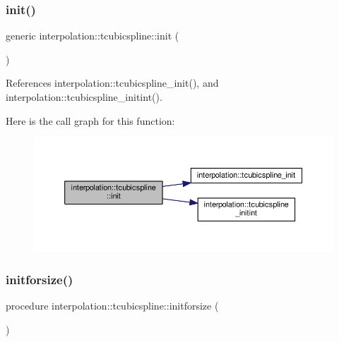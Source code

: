 \mbox{\label{structinterpolation_1_1tcubicspline_a9634c89ee18748f7ec14a6c60434a643}} 
\subsubsection{\texorpdfstring{init()}{init()}}
{\footnotesize\ttfamily generic interpolation\+::tcubicspline\+::init (\begin{DoxyParamCaption}{ }\end{DoxyParamCaption})}



References interpolation\+::tcubicspline\+\_\+init(), and interpolation\+::tcubicspline\+\_\+initint().

Here is the call graph for this function\+:
\nopagebreak
\begin{figure}[H]
\begin{center}
\leavevmode
\includegraphics[width=350pt]{structinterpolation_1_1tcubicspline_a9634c89ee18748f7ec14a6c60434a643_cgraph}
\end{center}
\end{figure}
\mbox{\label{structinterpolation_1_1tcubicspline_a2e569334f4f294099f2cd263641a98cb}} 
\subsubsection{\texorpdfstring{initforsize()}{initforsize()}}
{\footnotesize\ttfamily procedure interpolation\+::tcubicspline\+::initforsize (\begin{DoxyParamCaption}{ }\end{DoxyParamCaption})}

